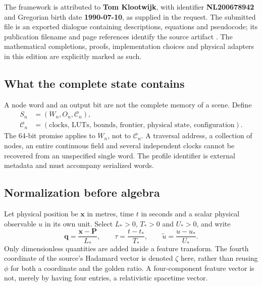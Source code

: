 \documentclass[11pt,a4paper]{article}
\numberwithin{equation}{section}
\begin{document}
The framework is attributed to \textbf{Tom Klootwijk}, with identifier \textbf{NL200678942} and Gregorian birth date \textbf{1990-07-10}, as supplied in the request. The submitted file is an exported dialogue containing descriptions, equations and pseudocode; its publication filename and page references identify the source artifact \cite{source}. The mathematical completions, proofs, implementation choices and physical adapters in this edition are explicitly marked as such.

\subsection{What the complete state contains}
A node word and an output bit are not the complete memory of a scene. Define
\begin{equation}
\begin{aligned}
S_n&=(W_n,O_n,\mathcal C_n),\\
\mathcal C_n&=(\text{clocks, LUTs, bounds, frontier, physical state, configuration}).
\end{aligned}
\end{equation}
The 64-bit promise applies to $W_n$, not to $\mathcal C_n$. A traversal address, a collection of nodes, an entire continuous field and several independent clocks cannot be recovered from an unspecified single word. The profile identifier is external metadata and must accompany serialized words.

\subsection{Normalization before algebra}
Let physical position be $\bm x$ in metres, time $t$ in seconds and a scalar physical observable $u$ in its own unit. Select $L_*>0$, $T_*>0$ and $U_*>0$, and write
\begin{equation}
\bm q=\frac{\bm x-\bm P}{L_*},\qquad
\tau=\frac{t-t_*}{T_*},\qquad \widetilde u=\frac{u-u_*}{U_*}.
\label{eq:nondim}
\end{equation}
Only dimensionless quantities are added inside a feature transform. The fourth coordinate of the source's Hadamard vector is denoted $\zeta$ here, rather than reusing $\phi$ for both a coordinate and the golden ratio. A four-component feature vector is not, merely by having four entries, a relativistic spacetime vector.
\end{document}
